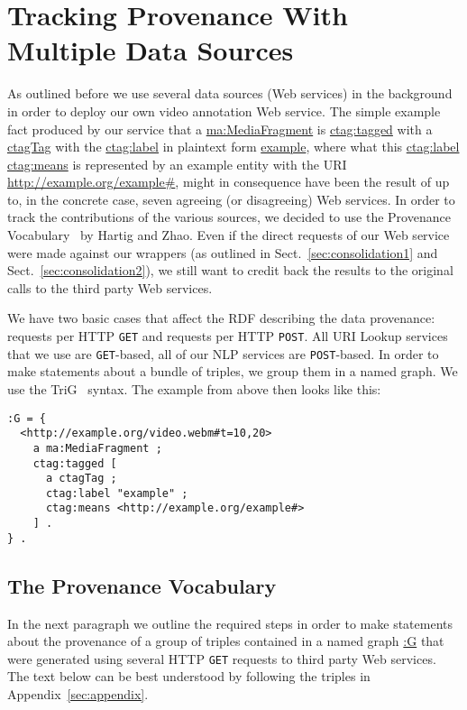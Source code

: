 \documentclass{acm_proc_article-sp}
\begin{document}
\section{Tracking Provenance With Multiple Data Sources}\label{sec:tracking}
As outlined before we use several data sources (Web services) in the background in order to deploy our own video annotation Web service. The simple example fact produced by our service that a \url{ma:MediaFragment} is \url{ctag:tagged} with a \url{ctagTag} with the \url{ctag:label} in plaintext form \url{example}, where what this \url{ctag:label} \url{ctag:means} is represented by an example entity with the URI \url{http://example.org/example#}, might in consequence have been the result of up to, in the concrete case, seven agreeing (or disagreeing) Web services. In order to track the contributions of the various sources, we decided to use the Provenance Vocabulary~\cite{Hartig:Provenance} by Hartig and Zhao. Even if the direct requests of our Web service were made against our wrappers (as outlined in Sect.~\ref{sec:consolidation1} and Sect.~\ref{sec:consolidation2}), we still want to credit back the results to the original calls to the third party Web services. 

We have two basic cases that affect the RDF describing the data provenance: requests per HTTP \texttt{GET} and requests per HTTP \texttt{POST}. All URI Lookup services that we use are \texttt{GET}-based, all of our NLP services are \texttt{POST}-based. In order to make statements about a bundle of triples, we group them in a named graph. We use the TriG~\cite{Bizer:TriG} syntax. The example from above then looks like this:
\begin{lstlisting}
:G = {
  <http://example.org/video.webm#t=10,20> 
    a ma:MediaFragment ;
    ctag:tagged [
      a ctagTag ;
      ctag:label "example" ;
      ctag:means <http://example.org/example#> 
    ] .  
} .
\end{lstlisting}


\subsection{The Provenance Vocabulary}\label{sec:provenance}
In the next paragraph we outline the required steps in order to make statements about the provenance of a group of triples contained in a named graph \url{:G} that were generated using several HTTP \texttt{GET} requests to third party Web services. The text below can be best understood by following the triples in Appendix~\ref{sec:appendix}.
\end{document}

